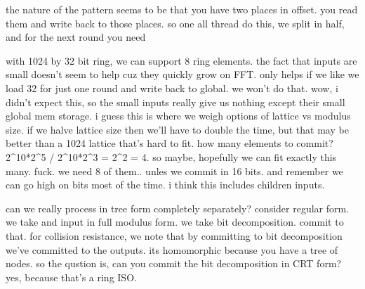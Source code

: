 the nature of the pattern seems to be that you have two places in offset. you read them and write back to those places. so one all thread do this, we split in half, and for the next round you need 

with 1024 by 32 bit ring, we can support 8 ring elements. the fact that inputs are small doesn't seem to help cuz they quickly grow on FFT. only helps if we like we load 32 for just one round and write back to global. we won't do that. wow, i didn't expect this, so the small inputs really give us nothing except their small global mem storage. 
i guess this is where we weigh options of lattice vs modulus size. if we halve lattice size then we'll have to double the time, but that may be better than a 1024 lattice that's hard to fit.
how many elements to commit? 2^10*2^5 / 2^10*2^3 = 2^2 = 4. so maybe, hopefully we can fit exactly this many. fuck. we need 8 of them.. unles we commit in 16 bits. and remember we can go high on bits most of the time. i think this includes children inputs. 

can we really process in tree form completely separately?
consider regular form. we take and input in full modulus form. we take bit decomposition. commit to that. for collision resistance, we note that by committing to bit decomposition we've committed to the outputs. its homomorphic because you have a tree of nodes.
so the qustion is, can you commit the bit decomposition in CRT form? yes, because that's a ring ISO.


